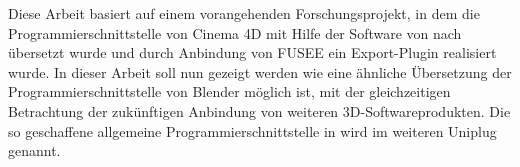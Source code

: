  \label{sec:Frage}

Diese Arbeit basiert auf einem vorangehenden Forschungsprojekt, in dem die Programmierschnittstelle von Cinema 4D mit Hilfe der Software  von \CC nach \CS übersetzt wurde und durch Anbindung von FUSEE ein Export-Plugin realisiert wurde.
In dieser Arbeit soll nun gezeigt werden wie eine ähnliche Übersetzung der Programmierschnittstelle von Blender möglich ist, mit der gleichzeitigen Betrachtung der zukünftigen Anbindung von weiteren 3D-Softwareprodukten. Die so geschaffene allgemeine Programmierschnittstelle in \CS wird im weiteren Uniplug genannt.



